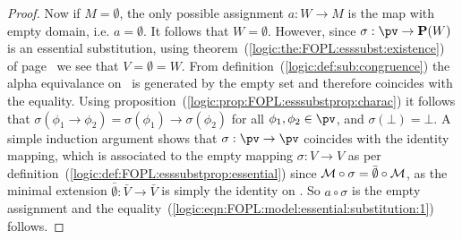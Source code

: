 \begin{proof}
Now if $M=\emptyset$, the only possible assignment $a:W\to M$ is the
map with empty domain, i.e. $a=\emptyset$. It follows that
$W=\emptyset$. However, since $\sigma:\pv\to{\bf P}(W)$ is an
essential substitution, using
theorem~(\ref{logic:the:FOPL:esssubst:existence}) of
page~\pageref{logic:the:FOPL:esssubst:existence} we see that
$V=\emptyset=W$. From definition~(\ref{logic:def:sub:congruence})
the alpha equivalance on \pv\ is generated by the empty set
and therefore coincides with the equality. Using
proposition~(\ref{logic:prop:FOPL:esssubstprop:charac}) it follows
that
$\sigma(\phi_{1}\to\phi_{2})=\sigma(\phi_{1})\to\sigma(\phi_{2})$
for all $\phi_{1},\phi_{2}\in\pv$, and $\sigma(\bot)=\bot$. A simple
induction argument shows that $\sigma:\pv\to\pv$ coincides with the
identity mapping, which is associated to the empty mapping
$\sigma:V\to V$ as per
definition~(\ref{logic:def:FOPL:esssubstprop:essential}) since
${\cal M}\circ\sigma=\bar{\emptyset}\circ{\cal M}$, as the minimal
extension $\bar{\emptyset}:\bar{V}\to\bar{V}$ is simply the identity
on \N. So $a\circ\sigma$ is the empty assignment and the
equality~(\ref{logic:eqn:FOPL:model:essential:substitution:1})
follows.
\end{proof}
